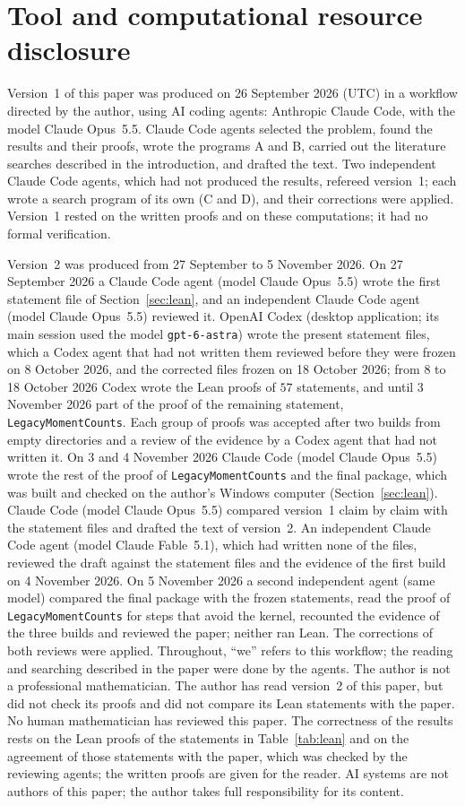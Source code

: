 \documentclass[11pt]{article}
\theoremstyle{definition}
\theoremstyle{remark}
\begin{document}
\section*{Tool and computational resource disclosure}
Version~1 of this paper was produced on 26 September 2026 (UTC) in a workflow
directed by the author, using AI coding agents: Anthropic Claude Code, with
the model Claude Opus~5.5. Claude Code agents selected the problem, found the
results and their proofs, wrote the programs A and B, carried out the
literature searches described in the introduction, and drafted the text. Two
independent Claude Code agents, which had not produced the results, refereed
version~1; each wrote a search program of its own (C and D), and their
corrections were applied. Version~1 rested on the written proofs and on these
computations; it had no formal verification.

Version~2 was produced from 27 September to
5 November 2026.
On 27 September 2026 a Claude Code agent (model Claude Opus~5.5)
wrote the first statement file of Section~\ref{sec:lean}, and an independent
Claude Code agent (model Claude Opus~5.5) reviewed it. OpenAI Codex (desktop
application; its main session used the model \texttt{gpt-6-astra}) wrote the
present statement files, which a Codex agent that had not written them
reviewed before they were frozen on 8 October 2026, and the corrected files
frozen on 18 October 2026; from 8 to 18 October 2026 Codex wrote the Lean
proofs of $57$ statements, and until 3 November 2026 part of the proof of the
remaining statement, \texttt{LegacyMomentCounts}. Each group of proofs was
accepted after two builds from empty directories and a review of the evidence
by a Codex agent that had not written it. On 3 and 4 November 2026 Claude Code
(model Claude Opus~5.5) wrote the rest of the proof of
\texttt{LegacyMomentCounts} and the final package, which was built and checked
on the author's Windows computer (Section~\ref{sec:lean}). Claude Code (model
Claude Opus~5.5) compared version~1 claim by claim with the statement files
and drafted the text of version~2.
An independent Claude Code agent (model Claude Fable~5.1), which had written
none of the files, reviewed the draft against the statement files and the
evidence of the first build on 4 November 2026. On 5 November 2026 a second
independent agent (same model) compared the final package with the frozen
statements, read the proof of \texttt{LegacyMomentCounts} for steps that avoid
the kernel, recounted the evidence of the three builds and reviewed the paper;
neither ran Lean. The corrections of both reviews were applied.
Throughout, ``we'' refers to this workflow; the reading and searching
described in the paper were done by the agents. The author is not a
professional mathematician.
The author has read version~2 of this paper, but did not check its proofs and
did not compare its Lean statements with the paper.
No human mathematician has reviewed this paper. The correctness of the results
rests on the Lean proofs of the statements in Table~\ref{tab:lean} and on the
agreement of those statements with the paper, which was checked by the
reviewing agents; the written proofs are given for the reader. AI systems are
not authors of this paper; the author takes full responsibility for its
content.
\end{document}
